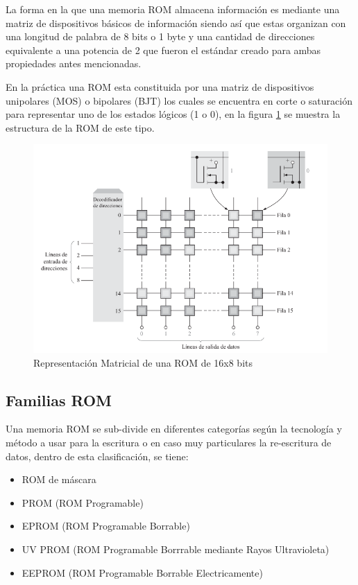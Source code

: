 \documentclass[stu, 10pt, floatsintext]{apa7}
\begin{document}
	La forma en la que una memoria ROM almacena información es mediante una matriz de dispositivos básicos de información siendo así que estas organizan con una longitud de palabra de 8 bits o 1 byte y una cantidad de direcciones equivalente a una potencia de 2 que fueron el estándar creado para ambas propiedades antes mencionadas.
	
	En la práctica una ROM esta constituida por una matriz de dispositivos unipolares (MOS) o bipolares (BJT) los cuales se encuentra en corte o saturación para representar uno de los estados lógicos (1 o 0), en la figura \ref{fig:matriz-rom} se muestra la estructura de la ROM de este tipo.
	\cite{floyd2014fundamentos}
	
	\begin{figure}
		\centering
		\includegraphics[width=0.7\linewidth]{media/matriz-rom}
		\caption{Representación Matricial de una ROM de 16x8 bits}
		\label{fig:matriz-rom}
	\end{figure}
	
	\subsection{Familias ROM}
	Una memoria ROM se sub-divide en diferentes categorías según la tecnología y método a usar para la escritura o en  caso muy particulares la re-escritura de datos, dentro de esta clasificación, se tiene:
	\begin{itemize}
		\item ROM de máscara
		\item PROM (ROM Programable)
		\item EPROM (ROM Programable Borrable)
		\item UV PROM (ROM Programable Borrrable mediante Rayos Ultravioleta)
		\item EEPROM (ROM Programable Borrable Electricamente)
	\end{itemize}
	
\end{document}

